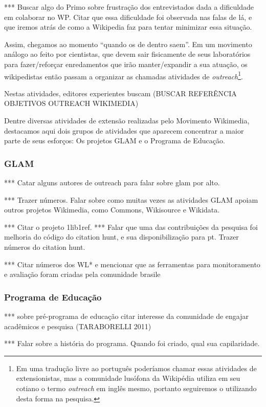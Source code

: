 *** Buscar algo do Primo sobre frustração dos entrevistados dada a dificuldade em colaborar no WP. Citar que essa dificuldade foi observada nas falas de lá, e que iremos atrás de como a Wikipedia faz para tentar minimizar essa situação.

Assim, chegamos ao momento ``quando os de dentro saem''. Em um movimento análogo ao feito por cientistas, que devem sair fisicamente de seus laboratórios para fazer/reforçar enredamentos que irão manter/expandir a sua atuação, os wikipedistas então passam a organizar as chamadas atividades de \textit{outreach}\footnote{Em uma tradução livre ao português poderíamos chamar essas atividades de extensionistas, mas a comunidade lusófona da Wikipédia utiliza em seu cotiano o termo \textit{outreach} em inglês mesmo, portanto seguiremos o utilizando desta forma na pesquisa.}. 

Nestas atividades, editores experientes buscam (BUSCAR REFERÊNCIA OBJETIVOS OUTREACH WIKIMEDIA)

Dentre diversas atividades de extensão realizadas pelo Movimento Wikimedia, destacamos aqui dois grupos de atividades que aparecem concentrar a maior parte de seus esforços: Os projetos GLAM e o Programa de Educação.


\subsubsection{GLAM}

*** Catar alguns autores de outreach para falar sobre glam por alto.

*** Trazer números. Falar sobre como muitas vezes as atividades GLAM apoiam outros projetos Wikimedia, como Commons, Wikisource e Wikidata.

***  Citar o projeto 1lib1ref.
***  Falar que uma das contribuições da pesquisa foi melhoria do código do citation hunt, e sua disponibilização para pt. Trazer números do citation hunt.

*** Citar números dos WL* e mencionar que as ferramentas para monitoramento e avaliação foram criadas pela comunidade brasile

\subsubsection{Programa de Educação}

*** sobre pré-programa de educação citar interesse da comunidade de engajar acadêmicos e pesquisa (TARABORELLI 2011)

*** Falar sobre a história do programa. Quando foi criado, qual sua capilaridade. 

